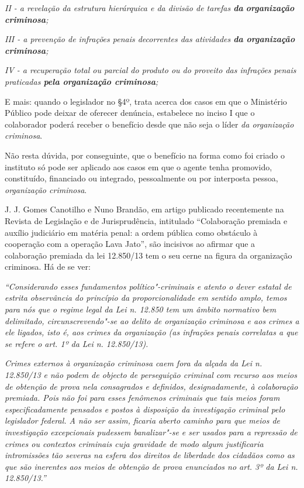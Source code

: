 \emph{II - a revelação da estrutura hierárquica e da divisão de tarefas
\textbf{da} \textbf{organização criminosa};}

\emph{III - a prevenção de infrações penais decorrentes das atividades
\textbf{da organização criminosa};}

\emph{IV - a recuperação total ou parcial do produto ou do proveito das
infrações penais praticadas \textbf{pela organização criminosa};}

E mais: quando o legislador no §4º, trata acerca dos casos em que o
Ministério Público pode deixar de oferecer denúncia, estabelece no
inciso I que o colaborador poderá receber o benefício desde que não seja
o líder \emph{da organização criminosa}.

Não resta dúvida, por conseguinte, que o benefício na forma como foi
criado o instituto só pode ser aplicado aos casos em que o agente tenha
promovido, constituído, financiado ou integrado, pessoalmente ou por
interposta pessoa, \emph{organização criminosa}.

J. J. Gomes Canotilho e Nuno Brandão, em artigo publicado recentemente
na Revista de Legislação e de Jurisprudência, intitulado ``Colaboração
premiada e auxílio judiciário em matéria penal: a ordem pública como
obstáculo à cooperação com a operação Lava Jato'', são incisivos ao
afirmar que a colaboração premiada da lei 12.850/13 tem o seu cerne na
figura da organização criminosa. Há de se ver:

\emph{``Considerando esses fundamentos político"-criminais e atento o
dever estatal de estrita observância do princípio da proporcionalidade
em sentido amplo, temos para nós que o regime legal da Lei n. 12.850 tem
um âmbito normativo bem delimitado, circunscrevendo"-se ao delito de
organização criminosa e aos crimes a ele ligados, isto é, aos crimes da
organização (as infrações penais correlatas a que se refere o art. 1º da
Lei n. 12.850/13).}

\emph{Crimes externos à organização criminosa caem fora da alçada da Lei
n. 12.850/13 e não podem de objecto de perseguição criminal com recurso
aos meios de obtenção de prova nela consagrados e definidos,
designadamente, à colaboração premiada. Pois não foi para esses
fenômenos criminais que tais meios foram especificadamente pensados e
postos à disposição da investigação criminal pelo legislador federal. A
não ser assim, ficaria aberto caminho para que meios de investigação
excepcionais pudessem banalizar"-se e ser usados para a repressão de
crimes ou contextos criminais cuja gravidade de modo algum justificaria
intromissões tão severas na esfera dos direitos de liberdade dos
cidadãos como as que são inerentes aos meios de obtenção de prova
enunciados no art. 3º da Lei n. 12.850/13.''}

